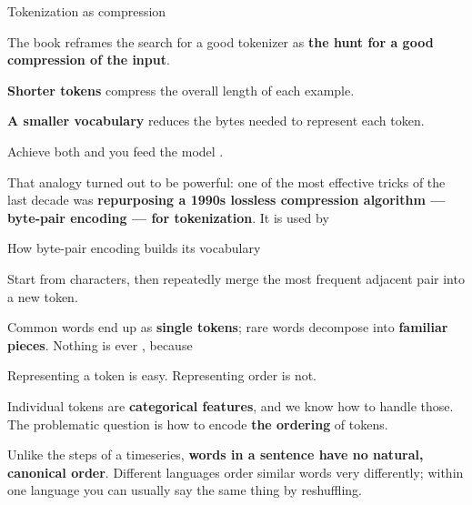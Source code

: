 \documentclass[aspectratio=169,11pt,t]{beamer}
\begin{document}
\begin{frame}[shrink=25]{Tokenization as compression}
{\fontsize{9.4}{12.6}\selectfont\color{fg2}The book reframes the search for a good tokenizer as \textbf{the hunt for a good compression of the input}.\par}\vskip 4pt
\begin{ibullets}
\item \textbf{Shorter tokens} compress the overall length of each example.
\item \textbf{A smaller vocabulary} reduces the bytes needed to represent each token.
\item Achieve both and you feed the model .
\end{ibullets}
\begin{iband}[signal]
That analogy turned out to be powerful: one of the most effective tricks of the last decade was \textbf{repurposing a 1990s lossless compression algorithm --- byte-pair encoding --- for tokenization}. It is used by 
\end{iband}
\end{frame}

\begin{frame}[shrink=25]{How byte-pair encoding builds its vocabulary}
{\fontsize{9.4}{12.6}\selectfont\color{fg2}Start from characters, then repeatedly merge the most frequent adjacent pair into a new token.\par}\vskip 4pt
\begin{iband}[signal]
Common words end up as \textbf{single tokens}; rare words decompose into \textbf{familiar pieces}. Nothing is ever \inlinecode{[UNK]}, because 
\end{iband}
\end{frame}


\begin{frame}[shrink=25]{Representing a token is easy. Representing order is not.}
{\fontsize{9.4}{12.6}\selectfont\color{fg2}Individual tokens are \textbf{categorical features}, and we know how to handle those. The problematic question is how to encode \textbf{the ordering} of tokens.\par}\vskip 4pt
\begin{iband}[signal]
Unlike the steps of a timeseries, \textbf{words in a sentence have no natural, canonical order}. Different languages order similar words very differently; within one language you can usually say the same thing by reshuffling. 
\end{iband}
\end{frame}
\end{document}
